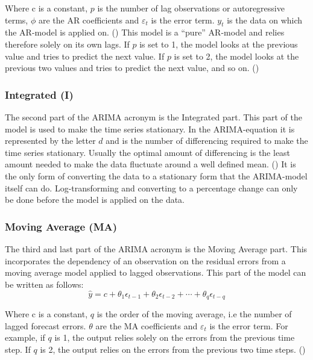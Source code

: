Where c is a constant, $p$ is the number of lag observations or autoregressive terms, $\phi$ are the AR coefficients and $\varepsilon_{t}$ is the error term. $y_{t}$ is the data on which the AR-model is applied on. (\cite{oracle_ARIMA}) This model is a ``pure'' AR-model and relies therefore solely on its own lags. If $p$ is set to 1, the model looks at the previous value and tries to predict the next value. If $p$ is set to 2, the model looks at the previous two values and tries to predict the next value, and so on. (\cite{artley_2022})


\subsubsection{Integrated (I)}\label{IntegratedTheory}
The second part of the ARIMA acronym is the Integrated part. This part of the model is used to make the time series stationary. In the ARIMA-equation it is represented by the letter $d$ and is the number of differencing required to make the time series stationary. Usually the optimal amount of differencing is the least amount needed to make the data fluctuate around a well defined mean. (\cite{nau_2019}) It is the only form of converting the data to a stationary form that the ARIMA-model itself can do. Log-transforming and converting to a percentage change can only be done before the model is applied on the data. 

\subsubsection{Moving Average (MA)}\label{MovingAverageTheory}
The third and last part of the ARIMA acronym is the Moving Average part. This incorporates the dependency of an observation on the residual errors from a moving average model applied to lagged observations. \parencite{hayes_2019} This part of the model can be written as follows:
\begin{equation}
\hat{y} = c + \theta_1\epsilon_{t-1} + \theta_2\epsilon_{t-2} + \cdots + \theta_q\epsilon_{t-q}
\end{equation}

Where c is a constant, $q$ is the order of the moving average, i.e the number of lagged forecast errors. $\theta$ are the MA coefficients and $\varepsilon_{t}$ is the error term. For example, if $q$ is 1, the output relies solely on the errors from the previous time step. If $q$ is 2, the output relies on the errors from the previous two time steps. (\cite{hyndman_athanasopoulos_2021}) 

